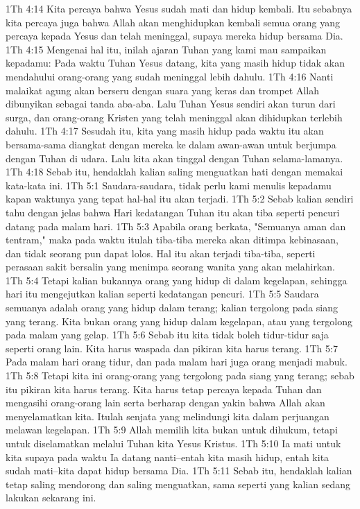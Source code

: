 1Th 4:14  Kita percaya bahwa Yesus sudah mati dan hidup kembali. Itu sebabnya kita percaya juga bahwa Allah akan menghidupkan kembali semua orang yang percaya kepada Yesus dan telah meninggal, supaya mereka hidup bersama Dia.
1Th 4:15  Mengenai hal itu, inilah ajaran Tuhan yang kami mau sampaikan kepadamu: Pada waktu Tuhan Yesus datang, kita yang masih hidup tidak akan mendahului orang-orang yang sudah meninggal lebih dahulu.
1Th 4:16  Nanti malaikat agung akan berseru dengan suara yang keras dan trompet Allah dibunyikan sebagai tanda aba-aba. Lalu Tuhan Yesus sendiri akan turun dari surga, dan orang-orang Kristen yang telah meninggal akan dihidupkan terlebih dahulu.
1Th 4:17  Sesudah itu, kita yang masih hidup pada waktu itu akan bersama-sama diangkat dengan mereka ke dalam awan-awan untuk berjumpa dengan Tuhan di udara. Lalu kita akan tinggal dengan Tuhan selama-lamanya.
1Th 4:18  Sebab itu, hendaklah kalian saling menguatkan hati dengan memakai kata-kata ini.
1Th 5:1  Saudara-saudara, tidak perlu kami menulis kepadamu kapan waktunya yang tepat hal-hal itu akan terjadi.
1Th 5:2  Sebab kalian sendiri tahu dengan jelas bahwa Hari kedatangan Tuhan itu akan tiba seperti pencuri datang pada malam hari.
1Th 5:3  Apabila orang berkata, "Semuanya aman dan tentram," maka pada waktu itulah tiba-tiba mereka akan ditimpa kebinasaan, dan tidak seorang pun dapat lolos. Hal itu akan terjadi tiba-tiba, seperti perasaan sakit bersalin yang menimpa seorang wanita yang akan melahirkan.
1Th 5:4  Tetapi kalian bukannya orang yang hidup di dalam kegelapan, sehingga hari itu mengejutkan kalian seperti kedatangan pencuri.
1Th 5:5  Saudara semuanya adalah orang yang hidup dalam terang; kalian tergolong pada siang yang terang. Kita bukan orang yang hidup dalam kegelapan, atau yang tergolong pada malam yang gelap.
1Th 5:6  Sebab itu kita tidak boleh tidur-tidur saja seperti orang lain. Kita harus waspada dan pikiran kita harus terang.
1Th 5:7  Pada malam hari orang tidur, dan pada malam hari juga orang menjadi mabuk.
1Th 5:8  Tetapi kita ini orang-orang yang tergolong pada siang yang terang; sebab itu pikiran kita harus terang. Kita harus tetap percaya kepada Tuhan dan mengasihi orang-orang lain serta berharap dengan yakin bahwa Allah akan menyelamatkan kita. Itulah senjata yang melindungi kita dalam perjuangan melawan kegelapan.
1Th 5:9  Allah memilih kita bukan untuk dihukum, tetapi untuk diselamatkan melalui Tuhan kita Yesus Kristus.
1Th 5:10  Ia mati untuk kita supaya pada waktu Ia datang nanti--entah kita masih hidup, entah kita sudah mati--kita dapat hidup bersama Dia.
1Th 5:11  Sebab itu, hendaklah kalian tetap saling mendorong dan saling menguatkan, sama seperti yang kalian sedang lakukan sekarang ini.
